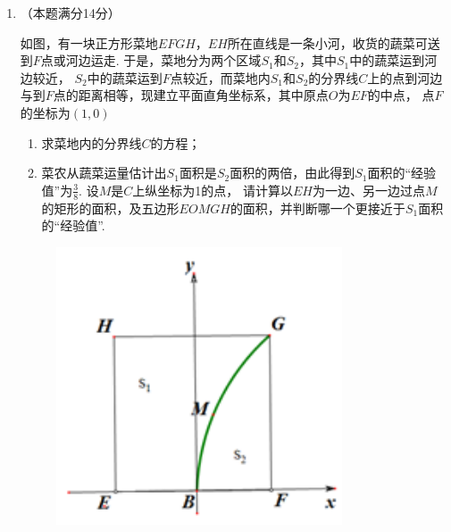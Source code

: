 \documentclass[12pt,space]{ctexart} %
\begin{document}
\begin{enumerate}[itemsep=-0.3em,topsep=0pt, resume]
    \item （本题满分14分）\\[0.5em] 
    \begin{minipage}[h][16em][t]{.63\textwidth}
      如图，有一块正方形菜地$EFGH$，$EH$所在直线是一条小河，收货的蔬菜可送到$F$点或河边运走. 于是，菜地分为两个区域$S_1$和$S_2$，其中$S_1$中的蔬菜运到河边较近，
      $S_2$中的蔬菜运到$F$点较近，而菜地内$S_1$和$S_2$的分界线$C$上的点到河边与到$F$点的距离相等，现建立平面直角坐标系，其中原点$O$为$EF$的中点，
      点$F$的坐标为$(1,0)$
      \begin{enumerate}[itemsep=-0.3em,label={(\arabic*)},topsep=0pt,labelsep=.5em,leftmargin=1.7em]
        \item 求菜地内的分界线$C$的方程；
        \item 菜农从蔬菜运量估计出$S_1$面积是$S_2$面积的两倍，由此得到$S_1$面积的“经验值”为$\displaystyle{\frac 38}$. 设$M$是$C$上纵坐标为1的点，
              请计算以$EH$为一边、另一边过点$M$的矩形的面积，及五边形$EOMGH$的面积，并判断哪一个更接近于$S_1$面积的“经验值”. 
      \end{enumerate}
    \end{minipage}
    \begin{minipage}[h][9em][b]{.35\textwidth}
      \begin{figure}[H]
        \centering
        \includegraphics[width=0.8\textwidth]{Image/sh-20.png}
      \end{figure}
    \end{minipage}


\end{enumerate}
\end{document}
